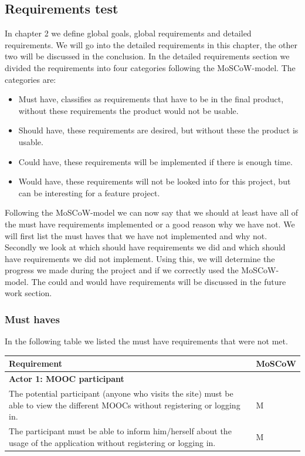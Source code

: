 \subsection{Requirements test}
In chapter 2 we define global goals, global requirements and detailed requirements.
We will go into the detailed requirements in this chapter, the other two will be discussed in the conclusion.
In the detailed requirements section we divided the requirements into four categories following the MoSCoW-model.
The categories are:
\begin{itemize}
\item Must have, classifies as requirements that have to be in the final product, without these requirements the product would not be usable.
\item Should have, these requirements are desired, but without these the product is usable.
\item Could have, these requirements will be implemented if there is enough time.
\item Would have, these requirements will not be looked into for this project, but can be interesting for a feature project.
\end{itemize}

Following the MoSCoW-model we can now say that we should at least have all of the must have requirements implemented or a good reason why we have not.
We will first list the must haves that we have not implemented and why not.
Secondly we look at which should have requirements we did and which should have requirements we did not implement.
Using this, we will determine the progress we made during the project and if we correctly used the MoSCoW-model.
The could and would have requirements will be discussed in the future work section.

\subsubsection{Must haves}
In the following table we listed the must have requirements that were not met.

\begin{tabular}{ | p{12cm} | p{2cm} | }
\hline
\textbf{Requirement} & \textbf{MoSCoW} \\ \hline
\multicolumn{2}{|p{14cm}|}{\textbf{Actor 1: MOOC participant}} \\ \hline
The potential participant (anyone who visits the site) must be able to view the different MOOCs without registering or logging in. & M \\ \hline
The participant must be able to inform him/herself about the usage of the application without registering or logging in. & M \\ \hline
\end{tabular}

